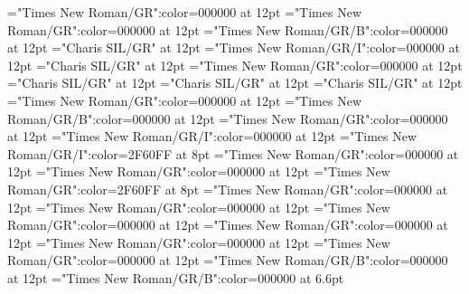 \documentclass[a4paper]{article}
\begin{document}
\pagestyle{plain}
\sloppy
\setlength{\parfillskip}{0pt plus 1fil}
\font\xitemtpi="Times New Roman/GR":color=000000 at 12pt
\font\xitembzhfonipa="Times New Roman/GR":color=000000 at 12pt
\font\xitemxitemheadwordbefore="Times New Roman/GR/B":color=000000 at 12pt
\font\xitemxitemexamplesbefore="Charis SIL/GR" at 12pt
\font\xitemxitemexamplebefore="Times New Roman/GR/I":color=000000 at 12pt
\font\xitemxitemslotsbefore="Charis SIL/GR" at 12pt
\font\entrydicBody="Times New Roman/GR":color=000000 at 12pt
\font{}="Charis SIL/GR" at 12pt
\font{}="Charis SIL/GR" at 12pt
\font{}="Charis SIL/GR" at 12pt
\font\entryletDatadicBody="Times New Roman/GR":color=000000 at 12pt
\font\headwordbzhentryletDatadicBody="Times New Roman/GR/B":color=000000 at 12pt
\font\examplesentryletDatadicBody="Times New Roman/GR":color=000000 at 12pt
\font\examplebzhexamplesentryletDatadicBody="Times New Roman/GR/I":color=000000 at 12pt
\font\xlanguagetagenexamplebzhexamplesentryletDatadicBody="Times New Roman/GR/I":color=2F60FF at 8pt
\font\translationsexamplesentryletDatadicBody="Times New Roman/GR":color=000000 at 12pt
\font\translationentranslationsexamplesentryletDatadicBody="Times New Roman/GR":color=000000 at 12pt
\font\xlanguagetagentranslationentranslationsexamplesentryletDatadicBody="Times New Roman/GR":color=2F60FF at 8pt
\font\relationstranslationsexamplesentryletDatadicBody="Times New Roman/GR":color=000000 at 12pt
\font\xitemrelationstranslationsexamplesentryletDatadicBody="Times New Roman/GR":color=000000 at 12pt
\font\lexreftypeenxitemrelationstranslationsexamplesentryletDatadicBody="Times New Roman/GR":color=000000 at 12pt
\font\lexreftargetsxitemrelationstranslationsexamplesentryletDatadicBody="Times New Roman/GR":color=000000 at 12pt
\font\xitemlexreftargetsxitemrelationstranslationsexamplesentryletDatadicBody="Times New Roman/GR":color=000000 at 12pt
\font\sensecrossrefbzhxitemlexreftargetsxitemrelationstranslationsexamplesentryletDatadicBody="Times New Roman/GR":color=000000 at 12pt
\font\xsensenumberensensecrossrefbzhxitemlexreftargetsxitemrelationstranslationsexamplesentryletDatadicBody="Times New Roman/GR/B":color=000000 at 12pt
\font\xhomographnumberbzhsensecrossrefbzhxitemlexreftargetsxitemrelationstranslationsexamplesentryletDatadicBody="Times New Roman/GR/B":color=000000 at 6.6pt

\mbox{} 
\newpage 
\newpage 
\setcounter{page}{1} 
\pagestyle{fancy} 
\end{document}
